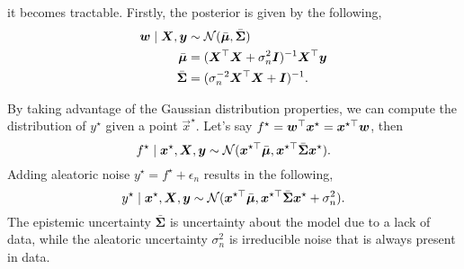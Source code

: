 it becomes tractable. Firstly, the posterior is given by the
following,
\begin{align*}
    \bm{w}\mid \bm{X},\bm{y} & \sim \mathcal{N}(\bar{\bm{\mu}},\bar{\bm{\Sigma}})                                   \\
    \bar{\bm{\mu}}             & = (\bm{X}^\top \bm{X} + \sigma_n^2 \bm{I})^{-1} \bm{X}^\top \bm{y} \\
    \bar{\bm{\Sigma}}          & = (\sigma_n^{-2} \bm{X}^\top \bm{X} + \bm{I})^{-1}.
\end{align*}

By taking advantage of the Gaussian distribution properties, we can compute
the distribution of $y^\star$ given a point $\vec{x}^\star$. Let's say
$f^\star = \bm{w}^\top \bm{x}^\star = \bm{x}^{\star\top} \bm{w}$, then \[
    f^\star\mid \bm{x}^\star,\bm{X},\bm{y} \sim \mathcal{N}(\bm{x}^{\star\top} \bar{\bm{\mu}}, \bm{x}^{\star\top} \bar{\bm{\Sigma}} \bm{x}^\star).
\]
Adding aleatoric noise $y^\star=f^\star + \epsilon_n$ results in the following, \[
    y^\star\mid \bm{x}^\star,\bm{X},\bm{y} \sim \mathcal{N}(\bm{x}^{\star\top} \bar{\bm{\mu}}, \bm{x}^{\star\top} \bar{\bm{\Sigma}} \bm{x}^\star + \sigma_n^2).
\]
The epistemic uncertainty $\bar{\bm{\Sigma}}$ is uncertainty about the model due
to a lack of data, while the aleatoric uncertainty $\sigma_n^2$ is
irreducible noise that is always present in data.
